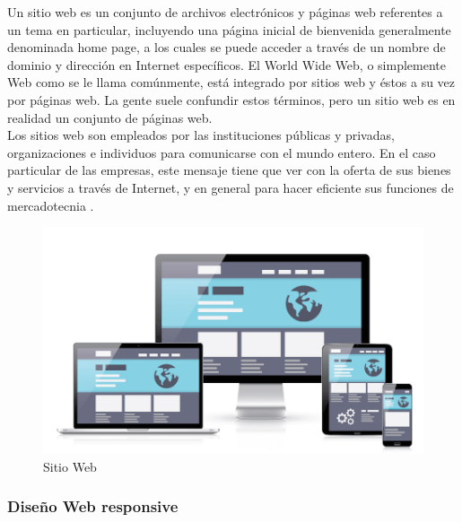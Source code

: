 		{Un sitio web es un conjunto de archivos electrónicos y páginas web referentes a un tema en particular, incluyendo una página inicial de bienvenida generalmente denominada home page, a los cuales se puede acceder a través de un nombre de dominio y dirección en Internet específicos. El World Wide Web, o simplemente Web como se le llama comúnmente, está integrado por sitios web y éstos a su vez por páginas web. La gente suele confundir estos términos, pero un sitio web es en realidad un conjunto de páginas web.\\
			
		Los sitios web son empleados por las instituciones públicas y privadas, organizaciones e individuos para comunicarse con el mundo entero. En el caso particular de las empresas, este mensaje tiene que ver con la oferta de sus bienes y servicios a través de Internet, y en general para hacer eficiente sus funciones de mercadotecnia \cite{website}.
	
		\begin{figure}[H]
			\centering
			\includegraphics[width=0.8\linewidth]{description/framework/website.png}
			\caption{Sitio Web}
		\end{figure}
		}
		
		
		\subsubsection{Diseño Web responsive}
		
